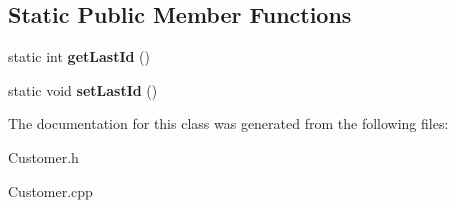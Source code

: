 \subsection*{Static Public Member Functions}
\begin{DoxyCompactItemize}
\item 
static int {\bfseries get\+Last\+Id} ()\hypertarget{classCustomer_a8bbc27f996653fc209aef876146a2667}{}\label{classCustomer_a8bbc27f996653fc209aef876146a2667}

\item 
static void {\bfseries set\+Last\+Id} ()\hypertarget{classCustomer_aaece4550faac5834bc9d7e4158eb1498}{}\label{classCustomer_aaece4550faac5834bc9d7e4158eb1498}

\end{DoxyCompactItemize}


The documentation for this class was generated from the following files\+:\begin{DoxyCompactItemize}
\item 
Customer.\+h\item 
Customer.\+cpp\end{DoxyCompactItemize}
